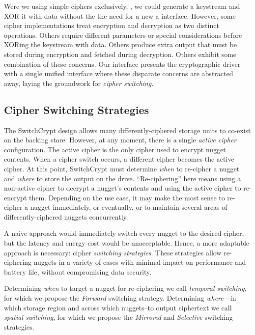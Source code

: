 Were we using simple ciphers exclusively, , we could generate a keystream and XOR it with data without the
the need for a new a interface. However, some cipher implementations treat
encryption and decryption as two distinct operations. Others require different
parameters or special considerations before XORing the keystream with data.
Others produce extra output that must be stored during encryption and fetched
during decryption. Others exhibit some combination of these concerns. Our
interface presents the cryptographic driver with a single unified interface
where these disparate concerns are abstracted away, laying the groundwork for
\emph{cipher switching}.

\subsection{Cipher Switching Strategies} \label{subsec:strategies}

The SwitchCrypt design allows many differently-ciphered storage units to
co-exist on the backing store. However, at any moment, there is a single
\emph{active cipher} configuration. The active cipher is the only cipher used to
encrypt nugget contents. When a cipher switch occurs, a different cipher becomes
the active cipher. At this point, SwitchCrypt must determine \emph{when} to
re-cipher a nugget and \emph{where} to store the output on the drive.
``Re-ciphering'' here means using a non-active cipher to decrypt a nugget's
contents and using the active cipher to re-encrypt them. Depending on the use
case, it may make the most sense to re-cipher a nugget immediately, or
eventually, or to maintain several areas of differently-ciphered nuggets
concurrently.

A naive approach would immediately switch every nugget to the desired cipher,
but the latency and energy cost would be unacceptable. Hence, a more adaptable
approach is necessary: cipher \emph{switching strategies}. These strategies
allow re-ciphering nuggets in a variety of cases with minimal impact on
performance and battery life, without compromising data security.

Determining \emph{when} to target a nugget for re-ciphering we call
\emph{temporal switching}, for which we propose the \emph{Forward} switching
strategy. Determining \emph{where}---in which storage region and across which
nuggets--to output ciphertext we call \emph{spatial switching}, for which we
propose the \emph{Mirrored} and \emph{Selective} switching strategies.

